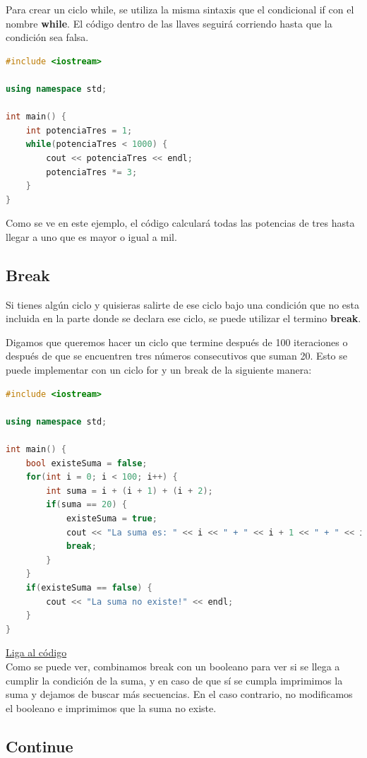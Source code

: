 \documentclass{article}
\begin{document}
Para crear un ciclo while, se utiliza la misma sintaxis que el condicional if con el nombre \textbf{while}. El código dentro de las llaves seguirá corriendo hasta que la condición sea falsa.

\begin{lstlisting}[language=C++, title=Ciclo while]
#include <iostream>

using namespace std;

int main() {
	int potenciaTres = 1;
	while(potenciaTres < 1000) {
		cout << potenciaTres << endl;
		potenciaTres *= 3;
	}
}
\end{lstlisting}

Como se ve en este ejemplo, el código calculará todas las potencias de tres hasta llegar a uno que es mayor o igual a mil.

\subsection{Break}

Si tienes algún ciclo y quisieras salirte de ese ciclo bajo una condición que no esta incluida en la parte donde se declara ese ciclo, se puede utilizar el termino \textbf{break}.

Digamos que queremos hacer un ciclo que termine después de 100 iteraciones o después de que se encuentren tres números consecutivos que suman 20. Esto se puede implementar con un ciclo for y un break de la siguiente manera:

\begin{lstlisting}[language=C++, title=Break]
#include <iostream>

using namespace std;

int main() {
	bool existeSuma = false;
	for(int i = 0; i < 100; i++) {
		int suma = i + (i + 1) + (i + 2);
		if(suma == 20) {
			existeSuma = true;
			cout << "La suma es: " << i << " + " << i + 1 << " + " << i + 2 << endl;
			break;
		}
	}
	if(existeSuma == false) {
		cout << "La suma no existe!" << endl;
	}
}
\end{lstlisting}
\href{https://repl.it/@Jamesscn/Suma-Triple}{Liga al código}\\

Como se puede ver, combinamos break con un booleano para ver si se llega a cumplir la condición de la suma, y en caso de que sí se cumpla imprimimos la suma y dejamos de buscar más secuencias. En el caso contrario, no modificamos el booleano e imprimimos que la suma no existe.

\subsection{Continue}
\end{document}
